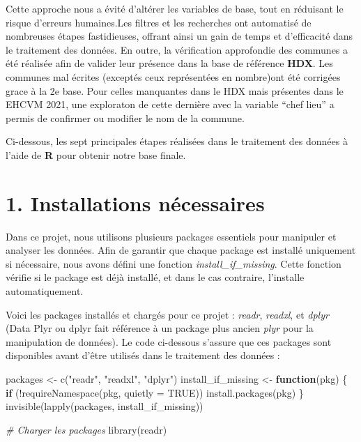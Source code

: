 \documentclass[
]{article}
\newenvironment{Shaded}{\begin{snugshade}}{\end{snugshade}}
\newcommand{\AttributeTok}[1]{\textcolor[rgb]{0.77,0.63,0.00}{#1}}
\newcommand{\CommentTok}[1]{\textcolor[rgb]{0.56,0.35,0.01}{\textit{#1}}}
\newcommand{\ConstantTok}[1]{\textcolor[rgb]{0.00,0.00,0.00}{#1}}
\newcommand{\ControlFlowTok}[1]{\textcolor[rgb]{0.13,0.29,0.53}{\textbf{#1}}}
\newcommand{\FunctionTok}[1]{\textcolor[rgb]{0.00,0.00,0.00}{#1}}
\newcommand{\NormalTok}[1]{#1}
\newcommand{\OtherTok}[1]{\textcolor[rgb]{0.56,0.35,0.01}{#1}}
\newcommand{\SpecialCharTok}[1]{\textcolor[rgb]{0.00,0.00,0.00}{#1}}
\newcommand{\StringTok}[1]{\textcolor[rgb]{0.31,0.60,0.02}{#1}}
\begin{document}
Cette approche nous a évité d'altérer les variables de base, tout en
réduisant le risque d'erreurs humaines.Les filtres et les recherches ont
automatisé de nombreuses étapes fastidieuses, offrant ainsi un gain de
temps et d'efficacité dans le traitement des données. En outre, la
vérification approfondie des communes a été réalisée afin de valider
leur présence dans la base de référence \textbf{HDX}. Les communes mal
écrites (exceptés ceux représentées en nombre)ont été corrigées grace à
la 2e base. Pour celles manquantes dans le HDX mais présentes dans le
EHCVM 2021, une exploraton de cette dernière avec la variable ``chef
lieu'' a permis de confirmer ou modifier le nom de la commune.

Ci-dessous, les sept principales étapes réalisées dans le traitement des
données à l'aide de \textbf{R} pour obtenir notre base finale.

\hypertarget{installations-nuxe9cessaires}{%
\section{1. Installations
nécessaires}\label{installations-nuxe9cessaires}}

Dans ce projet, nous utilisons plusieurs packages essentiels pour
manipuler et analyser les données. Afin de garantir que chaque package
est installé uniquement si nécessaire, nous avons défini une fonction
\emph{install\_if\_missing}. Cette fonction vérifie si le package est
déjà installé, et dans le cas contraire, l'installe automatiquement.

Voici les packages installés et chargés pour ce projet : \emph{readr},
\emph{readxl}, et \emph{dplyr} (Data Plyr ou dplyr fait référence à un
package plus ancien \emph{plyr} pour la manipulation de données). Le
code ci-dessous s'assure que ces packages sont disponibles avant d'être
utilisés dans le traitement des données :

\begin{Shaded}
\begin{Highlighting}[]
\NormalTok{packages }\OtherTok{\textless{}{-}} \FunctionTok{c}\NormalTok{(}\StringTok{"readr"}\NormalTok{, }\StringTok{"readxl"}\NormalTok{, }\StringTok{"dplyr"}\NormalTok{)}
\NormalTok{install\_if\_missing }\OtherTok{\textless{}{-}} \ControlFlowTok{function}\NormalTok{(pkg) \{}
  \ControlFlowTok{if}\NormalTok{ (}\SpecialCharTok{!}\FunctionTok{requireNamespace}\NormalTok{(pkg, }\AttributeTok{quietly =} \ConstantTok{TRUE}\NormalTok{)) }\FunctionTok{install.packages}\NormalTok{(pkg)}
\NormalTok{\}}
\FunctionTok{invisible}\NormalTok{(}\FunctionTok{lapply}\NormalTok{(packages, install\_if\_missing))}

\CommentTok{\# Charger les packages}
\FunctionTok{library}\NormalTok{(readr)      }
\end{Highlighting}
\end{Shaded}
\end{document}
